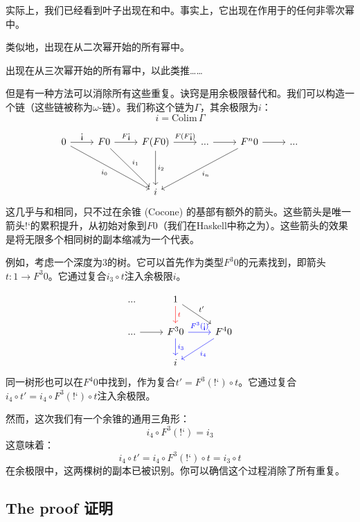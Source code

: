 \documentclass[DaoFP]{subfiles}
\begin{document}
 实际上，我们已经看到叶子出现在和中。事实上，它出现在作用于的任何非零次幂中。

 类似地，出现在从二次幂开始的所有幂中。

 出现在从三次幂开始的所有幂中，以此类推……

 但是有一种方法可以消除所有这些重复。诀窍是用余极限替代和。我们可以构造一个链（这些链被称为$\omega$-链）。我们称这个链为$\Gamma$，其余极限为$i$：
 \[i = \text{Colim} \, \Gamma \]

 \[
  \begin{tikzcd}
   0
   \arrow[r, "\mbox{!`}"]
   \arrow[ddrr, "i_0"']
   & F 0
   \arrow[r, "F\mbox{!`}"]
   \arrow[ddr, "i_1"]
   & F (F 0)
   \arrow[r, "F(F\mbox{!`})"]
   \arrow[dd, "i_2"]
   & ...
   \arrow[r]
   & F^n 0
   \arrow[r]
   \arrow[ddll, "i_n"]
   & ...
   \\
   \\
   &&i
  \end{tikzcd}
 \]
 这几乎与和相同，只不过在余锥 (Cocone) 的基部有额外的箭头。这些箭头是唯一箭头$\mbox{!`}$的累积提升，从初始对象到$F 0$（我们在Haskell中称之为）。这些箭头的效果是将无限多个相同树的副本缩减为一个代表。

 例如，考虑一个深度为3的树。它可以首先作为类型$F^3 0$的元素找到，即箭头$t \colon 1 \to F^3 0$。它通过复合$i_3 \circ t$注入余极限$i$。

 \[
  \begin{tikzcd}
   ...
   & 1
   \arrow[d, red, "t"]
   \arrow[dr, "t'"]
   \\
   ...
   \arrow[r]
   & F^3 0
   \arrow[r,  blue, "F^3 (\mbox{!`})"]
   \arrow[d, blue, "i_3"]
   & F^4 0
   \arrow[dl, blue, "i_4"]
   \\
   &  i
  \end{tikzcd}
 \]
 同一树形也可以在$F^4 0$中找到，作为复合$t' = F^3 (\mbox{!`}) \circ t$。它通过复合$i_4 \circ t' = i_4 \circ F^3 (\mbox{!`}) \circ t$注入余极限。

 然而，这次我们有一个余锥的通用三角形：
 \[i_4 \circ F^3 (\mbox{!`}) = i_3 \]
 这意味着：
 \[ i_4 \circ t' =  i_4 \circ F^3 (\mbox{!`}) \circ t =  i_3 \circ t\]
 在余极限中，这两棵树的副本已被识别。你可以确信这个过程消除了所有重复。

 \subsection{The proof 证明}
\end{document}

